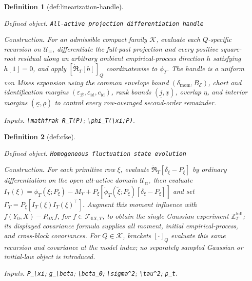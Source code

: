 \documentclass{article}
\newtheorem{definition}{Definition}
\begin{document}
\begin{definition}[def:linearization-handle]\label{def:linearization-handle}
\par\smallskip\noindent\emph{Defined object.} \texttt{All-\allowbreak{}active projection differentiation handle}
\par\smallskip\noindent\emph{Construction.} For an admissible compact family \(\mathcal K\), evaluate each \(Q\)-specific recursion on \(\mathcal U_{\mathrm{rr}}\), differentiate the full-past projection and every positive square-root residual along an arbitrary ambient empirical-process direction \(h\) satisfying \(h[1]=0\), and apply \([\dot{\mathfrak R}_T[h]]_Q\) coordinatewise to \(\phi_T\). The handle is a uniform von Mises expansion using the common envelope bound \((\delta_{\mathrm{mom}},B_{\mathcal E})\), chart and identification margins \((\varepsilon_{\mathcal B},\varepsilon_{\mathrm{id}},c_{\mathrm{id}})\), rank bounds \((\underline j,\underline x)\), overlap \(\eta\), and interior margins \((\underline\kappa,\underline\rho)\) to control every row-averaged second-order remainder.
\par\smallskip\noindent\emph{Inputs.} \texttt{\textbackslash{}\allowbreak{}mathfrak R\_\allowbreak{}T(P)}; \texttt{\textbackslash{}\allowbreak{}phi\_\allowbreak{}T(\textbackslash{}\allowbreak{}xi;\allowbreak{}P)}.
\end{definition}

\begin{definition}[def:cfse]\label{def:cfse}
\par\smallskip\noindent\emph{Defined object.} \texttt{Homogeneous fluctuation state evolution}
\par\smallskip\noindent\emph{Construction.} For each primitive row \(\xi\), evaluate \(\dot{\mathfrak R}_T[\delta_\xi-P_\xi]\) by ordinary differentiation on the open all-active domain \(\mathcal U_{\mathrm{rr}}\), then evaluate \(I_T(\xi)=\phi_T(\xi;P_\xi)-M_T+P_\xi[\dot\phi_T(\widetilde\xi;P_\xi)[\delta_\xi-P_\xi]]\) and set \(\Gamma_T=P_\xi[I_T(\xi)I_T(\xi)^{\top}]\). Augment this moment influence with \(f(Y_0,X)-P_{0X}f\), for \(f\in\mathcal F_{0X,T}\), to obtain the single Gaussian experiment \(\mathbb Z_T^{\mathrm{full}}\); its displayed covariance formula supplies all moment, initial empirical-process, and cross-block covariances. For \(Q\in\mathcal K\), brackets \([\cdot]_Q\) evaluate this same recursion and covariance at the model index; no separately sampled Gaussian or initial-law object is introduced.
\par\smallskip\noindent\emph{Inputs.} \texttt{P\_\allowbreak{}\textbackslash{}\allowbreak{}xi}; \texttt{g\_\allowbreak{}\textbackslash{}\allowbreak{}beta}; \texttt{\textbackslash{}\allowbreak{}beta\_\allowbreak{}0}; \texttt{\textbackslash{}\allowbreak{}sigma\textasciicircum{}2}; \texttt{\textbackslash{}\allowbreak{}tau\textasciicircum{}2}; \texttt{p\_\allowbreak{}t}.
\end{definition}
\end{document}
